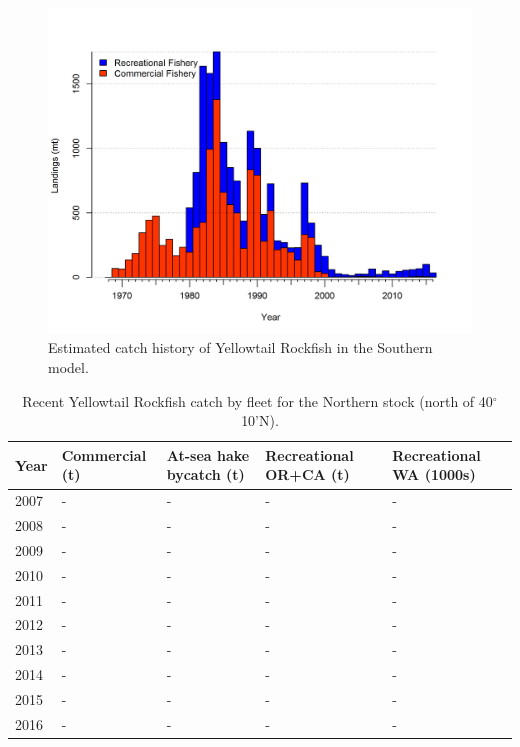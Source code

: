 \documentclass[12pt,]{article}
\begin{document}
\begin{figure}[htbp]
\centering
\includegraphics{r4ss/plots_mod2/catch2 landings stacked.png}
\caption{Estimated catch history of Yellowtail Rockfish in the Southern
model. \label{fig:r4ss_catch_S}}
\end{figure}

\begin{table}[ht]
\centering
\caption{Recent Yellowtail Rockfish catch by 
                                             fleet for the Northern stock 
                                             (north of 40$^\circ$ 10'N).} 
\label{tab:Exec_catch_N}
\begin{tabular}{l>{\centering}p{1.0in}>{\centering}p{1.0in}>{\centering}p{1.0in}>{\centering}p{1.0in}}
  \hline
Year & Commercial (t) & At-sea hake bycatch (t) & Recreational OR+CA (t) & Recreational WA (1000s) \\ 
  \hline
2007 & - & - & - & - \\ 
  2008 & - & - & - & - \\ 
  2009 & - & - & - & - \\ 
  2010 & - & - & - & - \\ 
  2011 & - & - & - & - \\ 
  2012 & - & - & - & - \\ 
  2013 & - & - & - & - \\ 
  2014 & - & - & - & - \\ 
  2015 & - & - & - & - \\ 
  2016 & - & - & - & - \\ 
   \hline
\end{tabular}
\end{table}
\end{document}
